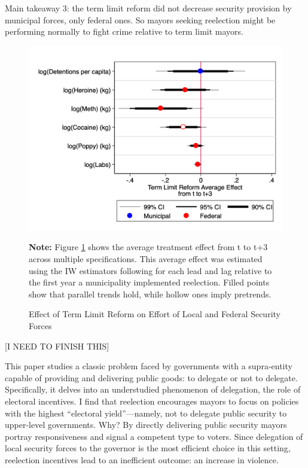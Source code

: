 \documentclass[12pt]{amsart}
\makeatletter
\def\section{\@startsection{section}{1}
	\z@{1.0\linespacing\@plus\linespacing}{.5\linespacing}{\Large}}
\numberwithin{equation}{section}
\theoremstyle{definition}
\theoremstyle{definition}
\theoremstyle{definition}
\makeatother
\begin{document}
\clearpage 

 Main takeaway 3: the term limit reform did not decrease security provision by municipal forces, only federal ones. So mayors seeking reelection might be performing normally to fight crime relative to term limit mayors. 

\begin{figure}[H]  
\centering
\caption{Effect of Term Limit Reform on Effort of Local and Federal Security Forces} 
\label{fig:effort}

   
\includegraphics[width=1\textwidth]{../Figures/effort.png}
  
 \textbf{Note:} Figure \ref{fig:effort} shows the average treatment effect from t to t+3 across multiple specifications. This average effect was estimated using the IW estimators following \citet{abraham_sun_2020} for each lead and lag relative to the first year a municipality implemented reelection. Filled points show that parallel trends hold, while hollow ones imply pretrends.        
\end{figure} 

 
\section{Conclusion \label{sec:conclusion}}

[I NEED TO FINISH THIS]

This paper studies a classic problem faced by governments with a supra-entity capable of providing and delivering public goods: to delegate or not to delegate. Specifically, it delves into an understudied phenomenon of delegation, the role of electoral  incentives. I find that reelection encourages mayors to focus on policies with the highest “electoral yield”—namely, not to delegate public security to upper-level governments. Why? By directly delivering public security mayors portray responsiveness and signal a competent type to voters. Since delegation of local security forces to the governor is the most efficient choice in this setting, reelection incentives lead to an inefficient outcome: an increase in violence.   
  
\end{document}
